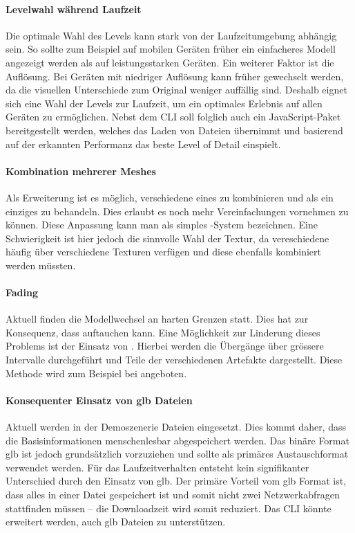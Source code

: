 \paragraph{Levelwahl während Laufzeit}
Die optimale Wahl des Levels kann stark von der Laufzeitumgebung abhängig sein. So sollte zum Beispiel auf mobilen Geräten früher ein einfacheres Modell angezeigt werden als auf leistungsstarken Geräten. Ein weiterer Faktor ist die Auflösung. Bei Geräten mit niedriger Auflösung kann früher gewechselt werden, da die visuellen Unterschiede zum Original weniger auffällig sind.
Deshalb eignet sich eine Wahl der Levels zur Laufzeit, um ein optimales Erlebnis auf allen Geräten zu ermöglichen.
Nebst dem \gls{CLI} soll folglich auch ein JavaScript-Paket bereitgestellt werden, welches das Laden von  Dateien übernimmt und basierend auf der erkannten Performanz das beste Level of Detail einspielt.

\paragraph{Kombination mehrerer Meshes}
Als Erweiterung ist es möglich, verschiedene  eines  zu kombinieren und als ein einziges  zu behandeln. Dies erlaubt es noch mehr Vereinfachungen vornehmen zu können. Diese Anpassung kann man als simples -System bezeichnen. Eine Schwierigkeit ist hier jedoch die sinnvolle Wahl der Textur, da vereschiedene  häufig über verschiedene Texturen verfügen und diese ebenfalls kombiniert werden müssten.

\paragraph{Fading}
\label{chap:fading}
Aktuell finden die Modellwechsel an harten Grenzen statt. Dies hat zur Konsequenz, dass  auftauchen kann. Eine Möglichkeit zur Linderung dieses Problems ist der Einsatz von . Hierbei werden die Übergänge über grössere Intervalle durchgeführt und Teile der verschiedenen Artefakte dargestellt. Diese Methode wird zum Beispiel bei  angeboten.

\paragraph{Konsequenter Einsatz von glb Dateien}
Aktuell werden in der Demoszenerie  Dateien eingesetzt. Dies kommt daher, dass die Basisinformationen menschenlesbar abgespeichert werden. Das binäre Format glb ist jedoch grundsätzlich  vorzuziehen und sollte als primäres Austauschformat verwendet werden. Für das Laufzeitverhalten entsteht kein signifikanter Unterschied durch den Einsatz von glb. Der primäre Vorteil vom glb Format ist, dass alles in einer Datei gespeichert ist und somit nicht zwei Netzwerkabfragen stattfinden müssen – die Download\-zeit wird somit reduziert. Das \gls{CLI} könnte erweitert werden, auch glb Dateien zu unterstützen.
